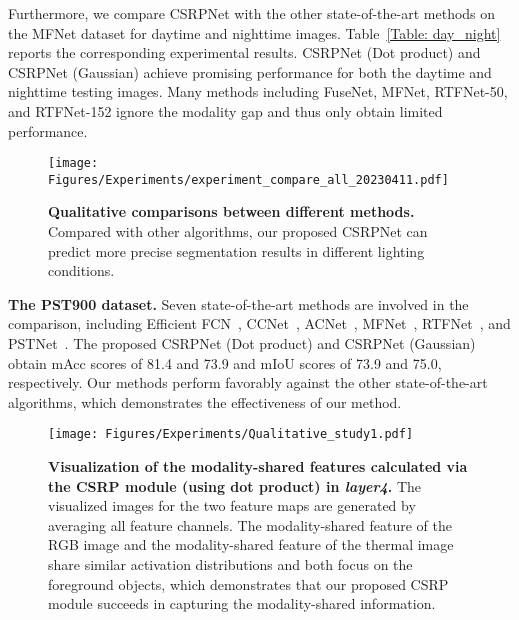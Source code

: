 Furthermore, we compare CSRPNet with the other state-of-the-art methods on the MFNet dataset for daytime and nighttime images. Table~\ref{Table: day_night} reports the corresponding experimental results. CSRPNet (Dot product) and CSRPNet (Gaussian) achieve promising performance for both the daytime and nighttime testing images. Many methods including FuseNet, MFNet, RTFNet-50, and RTFNet-152 ignore the modality gap and thus only obtain limited performance.


\begin{figure}[t!] 
\centering 
\texttt{[image: Figures/Experiments/experiment\_compare\_all\_20230411.pdf]} 
\caption{\textbf{Qualitative comparisons between different methods.} Compared with other algorithms, our proposed CSRPNet can predict more precise segmentation results in different lighting conditions.} 
\label{Fig: qualitative_comparison} 
\end{figure}

\vspace{1mm}
\noindent\textbf{The PST900 dataset.}
Seven state-of-the-art methods are involved in the comparison, including Efficient FCN~\cite{EffFCN}, CCNet~\cite{ccnet}, ACNet~\cite{ACNet}, MFNet~\cite{MFNet}, RTFNet~\cite{RTFNet}, and PSTNet~\cite{PSTNet}. The proposed CSRPNet (Dot product) and CSRPNet (Gaussian) obtain mAcc scores of 81.4 and 73.9 and mIoU scores of 73.9 and 75.0, respectively. Our methods perform favorably against the other state-of-the-art algorithms, which demonstrates the effectiveness of our method.

\begin{figure}[t!] 
\centering 
\texttt{[image: Figures/Experiments/Qualitative\_study1.pdf]} 
\caption{\textbf{Visualization of the modality-shared features calculated via the CSRP module (using dot product) in \emph{layer4}.} The visualized images for the two feature maps are generated by averaging all feature channels. The modality-shared feature of the RGB image  and the modality-shared feature of the thermal image  share similar activation distributions and both focus on the foreground objects, which demonstrates that our proposed CSRP module succeeds in capturing the modality-shared information.}
\label{Fig: qualitative_study} 
\end{figure}
